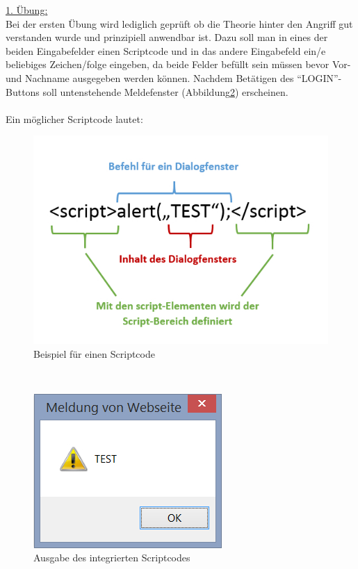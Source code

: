 \underline{1. Übung:}
\\
Bei der ersten Übung wird lediglich geprüft ob die Theorie hinter den Angriff gut verstanden wurde und prinzipiell anwendbar ist. Dazu soll man in eines der beiden Eingabefelder einen Scriptcode und in das andere Eingabefeld ein/e beliebiges Zeichen/folge eingeben, da beide Felder befüllt sein müssen bevor Vor- und Nachname ausgegeben werden können. Nachdem Betätigen des "`LOGIN"'-Buttons soll untenstehende Meldefenster (Abbildung\ref{fig:xss-reflected-DialogfensterI}) erscheinen.
\\
\\
Ein möglicher Scriptcode lautet:

\begin{figure}[h]
	\centering
	\includegraphics[scale = 0.4]{images/XSS/Scriptcode.jpg}
	\caption{Beispiel für einen Scriptcode}
	\label{fig:xss-reflected-Scriptcode}
\end{figure}

\ \\

\begin{figure}[h]
	\centering
	\includegraphics[scale = 0.4]{images/XSS/alert_meldung.jpg}
	\caption{Ausgabe des integrierten Scriptcodes}
	\label{fig:xss-reflected-DialogfensterI}
\end{figure}

